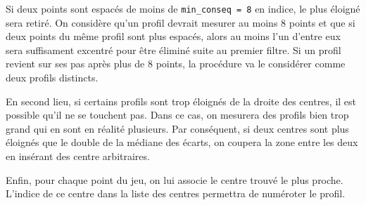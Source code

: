 \documentclass[12pt]{article}
\begin{document}
    Si deux points sont espacés de moins de \texttt{min\_conseq = 8} en indice, le plus éloigné sera retiré. On considère qu'un profil devrait mesurer au moins 8 points et que si deux points du même profil sont plus espacés, alors au moins l'un d'entre eux sera suffisament excentré pour être éliminé suite au premier filtre. Si un profil revient sur ses pas après plus de 8 points, la procédure va le considérer comme deux profils distincts.

    En second lieu, si certains profils sont trop éloignés de la droite des centres, il est possible qu'il ne se touchent pas. Dans ce cas, on mesurera des profils bien trop grand qui en sont en réalité plusieurs. Par conséquent, si deux centres sont plus éloignés que le double de la médiane des écarts, on coupera la zone entre les deux en insérant des centre arbitraires.

    Enfin, pour chaque point du jeu, on lui associe le centre trouvé le plus proche. L'indice de ce centre dans la liste des centres permettra de numéroter le profil.
\end{document}
